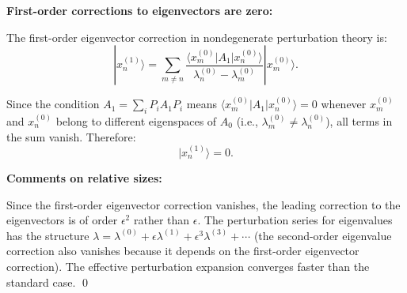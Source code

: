 \documentclass[12pt]{article}
\begin{document}
\textbf{First-order corrections to eigenvectors are zero:}

The first-order eigenvector correction in nondegenerate perturbation theory is:
\[
|x_n^{(1)}\rangle = \sum_{m \neq n} \frac{\langle x_m^{(0)}|A_1|x_n^{(0)}\rangle}{\lambda_n^{(0)} - \lambda_m^{(0)}} |x_m^{(0)}\rangle.
\]

Since the condition $A_1 = \sum_i P_i A_1 P_i$ means $\langle x_m^{(0)}|A_1|x_n^{(0)}\rangle = 0$ whenever $x_m^{(0)}$ and $x_n^{(0)}$ belong to different eigenspaces of $A_0$ (i.e., $\lambda_m^{(0)} \neq \lambda_n^{(0)}$), all terms in the sum vanish. Therefore:
\[
|x_n^{(1)}\rangle = 0.
\]

\textbf{Comments on relative sizes:}

Since the first-order eigenvector correction vanishes, the leading correction to the eigenvectors is of order $\epsilon^2$ rather than $\epsilon$. The perturbation series for eigenvalues has the structure $\lambda = \lambda^{(0)} + \epsilon\lambda^{(1)} + \epsilon^3\lambda^{(3)} + \cdots$ (the second-order eigenvalue correction also vanishes because it depends on the first-order eigenvector correction). The effective perturbation expansion converges faster than the standard case. \qed
\end{document}
